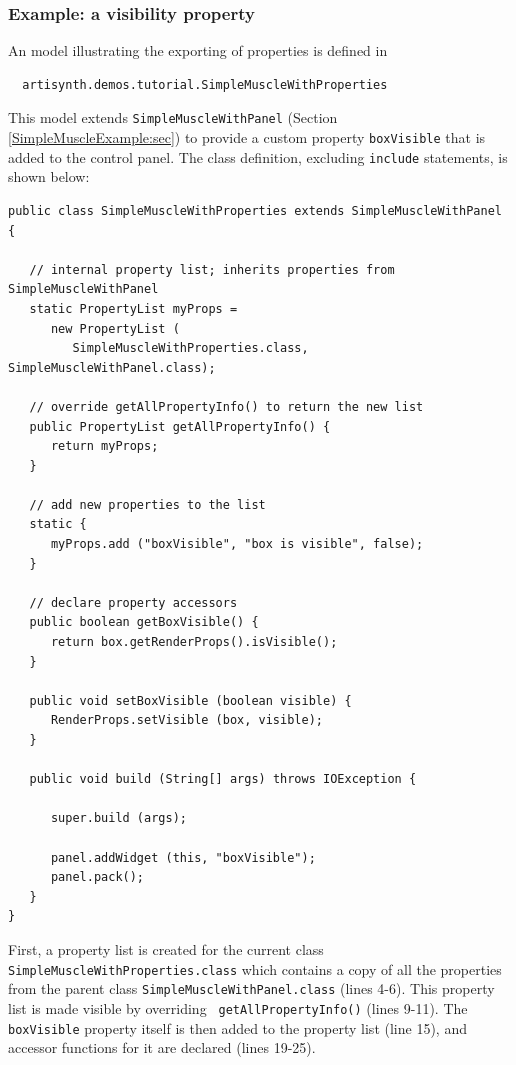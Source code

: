 \subsubsection{Example: a visibility property}
%
An model illustrating the exporting of properties is defined in
%
\begin{verbatim}
  artisynth.demos.tutorial.SimpleMuscleWithProperties
\end{verbatim}
%
This model extends {\tt SimpleMuscleWithPanel} (Section
\ref{SimpleMuscleExample:sec}) to provide a custom property
{\tt boxVisible} that is added to the control panel.
The class definition, excluding {\tt include} statements,
is shown below:
%
\lstset{numbers=left}
\begin{lstlisting}
public class SimpleMuscleWithProperties extends SimpleMuscleWithPanel {

   // internal property list; inherits properties from SimpleMuscleWithPanel
   static PropertyList myProps =
      new PropertyList (
         SimpleMuscleWithProperties.class, SimpleMuscleWithPanel.class);

   // override getAllPropertyInfo() to return the new list
   public PropertyList getAllPropertyInfo() {
      return myProps;
   }

   // add new properties to the list
   static {
      myProps.add ("boxVisible", "box is visible", false);
   }

   // declare property accessors
   public boolean getBoxVisible() {
      return box.getRenderProps().isVisible();
   }

   public void setBoxVisible (boolean visible) {
      RenderProps.setVisible (box, visible);
   }

   public void build (String[] args) throws IOException {

      super.build (args);

      panel.addWidget (this, "boxVisible");
      panel.pack();
   }
}
\end{lstlisting}
\lstset{numbers=none}
%
First, a property list is created for the current class {\tt
SimpleMuscleWithProperties.class} which contains a copy of all the
properties from the parent class {\tt SimpleMuscleWithPanel.class}
(lines 4-6). This property list is made visible by overriding {\tt
getAllPropertyInfo()} (lines 9-11). The {\tt boxVisible} property
itself is then added to the property list (line 15), and accessor
functions for it are declared (lines 19-25).

